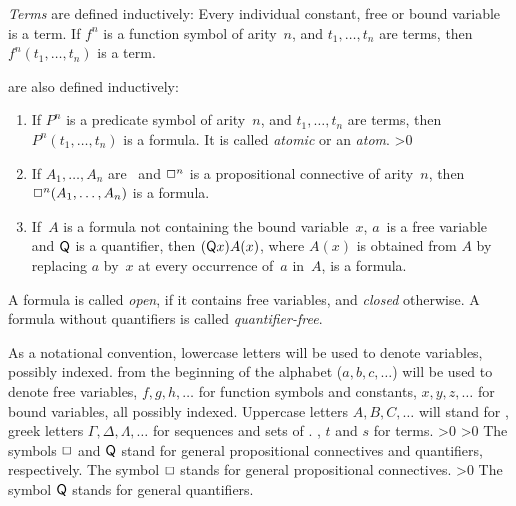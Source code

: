 \documentclass{article}
\begin{document}
\begin{definition}
   {\em Terms\/} are defined inductively: Every individual constant, free
   or bound variable is a term. If $f^n$ is a function symbol of arity~$n$,
   and $t_1,\dots,t_n$ are terms, then~$f^n(t_1,\ldots,t_n)$ is a term.

   {\em \Formulae\/} are also defined inductively:
   \begin{enumerate}
   \item If $P^n$ is a predicate symbol of arity~$n$, and
         $t_1,\ldots,t_n$ are terms, then $P^n(t_1,\ldots,t_n)$ is
         a formula. It is called {\em atomic} or an {\em atom}.
   \ifnum\NoOps>0 
      \item If $A_1,\ldots,A_n$ are \formulae\ and $\operator^n$ is
            a propositional connective of arity~$n$, then
            $\operator^n(A_1,\ldots,A_n)$ is a formula.
   \fi 
   \item If~$A$ is a formula not containing the bound
         variable~$x$, $a$~is a free variable and $\quantor$ is a quantifier,
         then $(\quantor x)A(x)$, where $A(x)$ is obtained from $A$ by
         replacing $a$ by~$x$ at every occurrence of~$a$ in~$A$, is a formula.
   \end{enumerate}
   A formula is called {\em open}, if it contains free variables, and
   {\em closed} otherwise.  A formula without quantifiers is called {\em
   quantifier-free}.

\fi %
\end{definition}


As a notational convention, lowercase letters
\ifprop 
   will be used to denote variables, possibly indexed.
\else
   from the beginning of the alphabet ($a, b, c,\ldots$) will be used
   to denote free variables, $f, g, h, \ldots$ for function symbols and
   constants, $x, y, z, \ldots$ for bound variables,
   all possibly indexed.
\fi 
Uppercase letters $A, B, C, \ldots$ will stand
for \formulae, greek letters $\Gamma, \Delta, \Lambda, \ldots$ for
sequences and sets of
\ifprop 
   \formulae.
\else
   \formulae, $t$ and $s$ for terms.
\fi
\ifnum\NoOps>0 
   \ifnum\NoQus>0
      The symbols $\operator$ and $\quantor$ stand for general propositional
      connectives and quantifiers, respectively.
   \else
      The symbol $\operator$ stands for general propositional connectives.
   \fi
\else
   \ifnum\NoQus>0
      The symbol $\quantor$ stands for general quantifiers.
   \fi
\fi
\end{document}
